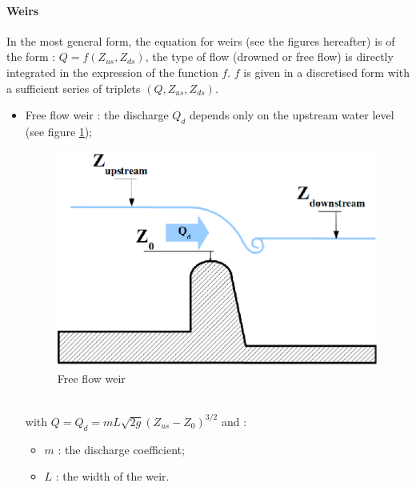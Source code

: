 \paragraph{Weirs\\}

\hspace*{1cm}

In the most general form, the equation for weirs (see the figures hereafter) is of the form : $Q = f(Z_{us},Z_{ds})$, the type of flow (drowned or free flow) is directly integrated in the expression of the function $f$. 
$f$ is given in a discretised form with a sufficient series of triplets $(Q,Z_{us},Z_{ds})$.

\begin{itemize}
 \item \textsf{Free flow weir} : the discharge  $Q_d$ depends only on the upstream water level (see figure \ref{Sd});
   \begin{figure}
     \begin{center}
        \includegraphics[scale=1.]{Figures/Schema_Seuil_Denoye.eps}
        \caption{Free flow weir }
        \label{Sd}
     \end{center}
    \end{figure}
   \\
   with $Q = Q_d = m L \sqrt{2g} (Z_{us}-Z_0)^{3/2}$ and :
      \begin{itemize}
        \item $m$ : the discharge coefficient;
        \item $L$ : the width of the weir. 
      \end{itemize}


\end{itemize}
